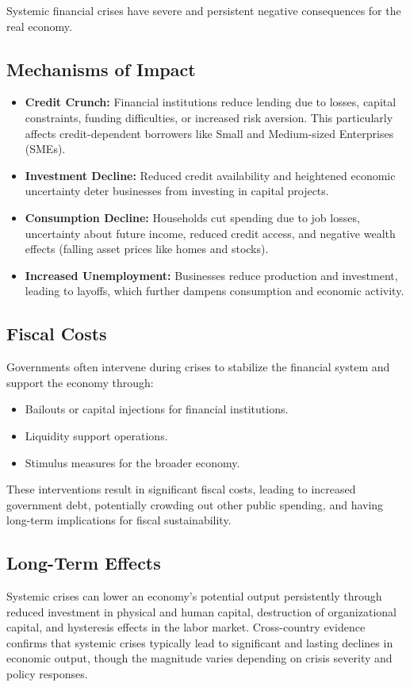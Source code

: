 Systemic financial crises have severe and persistent negative consequences for the real economy.

\subsection{Mechanisms of Impact}
\begin{itemize}
    \item \textbf{Credit Crunch:} Financial institutions reduce lending due to losses, capital constraints, funding difficulties, or increased risk aversion. This particularly affects credit-dependent borrowers like Small and Medium-sized Enterprises (SMEs).
    \item \textbf{Investment Decline:} Reduced credit availability and heightened economic uncertainty deter businesses from investing in capital projects.
    \item \textbf{Consumption Decline:} Households cut spending due to job losses, uncertainty about future income, reduced credit access, and negative wealth effects (falling asset prices like homes and stocks).
    \item \textbf{Increased Unemployment:} Businesses reduce production and investment, leading to layoffs, which further dampens consumption and economic activity.
\end{itemize}

\subsection{Fiscal Costs}
Governments often intervene during crises to stabilize the financial system and support the economy through:
\begin{itemize}
    \item Bailouts or capital injections for financial institutions.
    \item Liquidity support operations.
    \item Stimulus measures for the broader economy.
\end{itemize}
These interventions result in significant fiscal costs, leading to increased government debt, potentially crowding out other public spending, and having long-term implications for fiscal sustainability.

\subsection{Long-Term Effects}
Systemic crises can lower an economy's potential output persistently through reduced investment in physical and human capital, destruction of organizational capital, and hysteresis effects in the labor market. Cross-country evidence confirms that systemic crises typically lead to significant and lasting declines in economic output, though the magnitude varies depending on crisis severity and policy responses.

